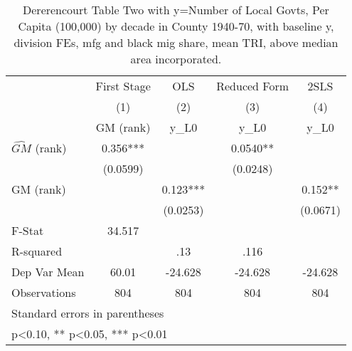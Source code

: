 \begin{table}[htbp]\centering
\def\sym#1{\ifmmode^{#1}\else\(^{#1}\)\fi}
\caption{Dererencourt Table Two with y=Number of Local Govts, Per Capita (100,000) by decade in County 1940-70, with baseline y, division FEs, mfg and black mig share, mean TRI, above median area incorporated.}
\begin{tabular}{l*{4}{c}}
\toprule
                    & First Stage   &         OLS   &Reduced Form   &        2SLS   \\
                    &\multicolumn{1}{c}{(1)}&\multicolumn{1}{c}{(2)}&\multicolumn{1}{c}{(3)}&\multicolumn{1}{c}{(4)}\\
                    &\multicolumn{1}{c}{GM  (rank)}&\multicolumn{1}{c}{y\_L0}&\multicolumn{1}{c}{y\_L0}&\multicolumn{1}{c}{y\_L0}\\
\midrule
$\hat{GM}$ (rank)   &       0.356***&               &      0.0540** &               \\
                    &    (0.0599)   &               &    (0.0248)   &               \\
\addlinespace
GM  (rank)          &               &       0.123***&               &       0.152** \\
                    &               &    (0.0253)   &               &    (0.0671)   \\
\midrule
F-Stat              &      34.517   &               &               &               \\
R-squared           &               &         .13   &        .116   &               \\
Dep Var Mean        &       60.01   &     -24.628   &     -24.628   &     -24.628   \\
Observations        &         804   &         804   &         804   &         804   \\
\bottomrule
\multicolumn{5}{l}{\footnotesize Standard errors in parentheses}\\
\multicolumn{5}{l}{\footnotesize * p<0.10, ** p<0.05, *** p<0.01}\\
\end{tabular}
\end{table}
